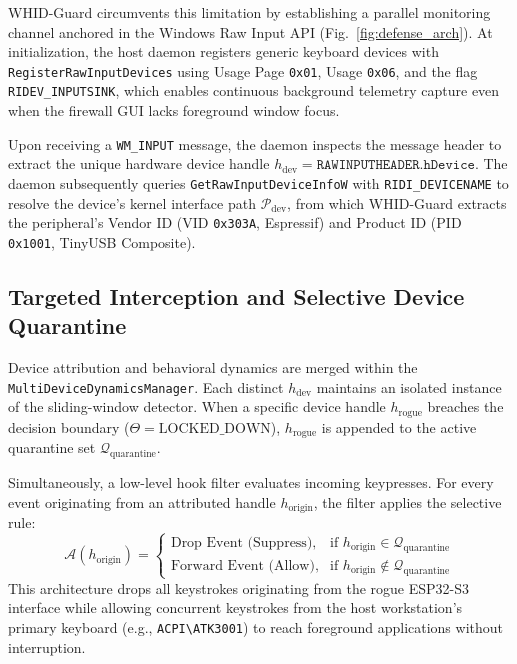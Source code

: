 \documentclass[conference]{IEEEtran}
\begin{document}
WHID-Guard circumvents this limitation by establishing a parallel monitoring channel anchored in the Windows Raw Input API (Fig.~\ref{fig:defense_arch}). At initialization, the host daemon registers generic keyboard devices with \texttt{RegisterRawInputDevices} using Usage Page \texttt{0x01}, Usage \texttt{0x06}, and the flag \texttt{RIDEV\_INPUTSINK}, which enables continuous background telemetry capture even when the firewall GUI lacks foreground window focus.

Upon receiving a \texttt{WM\_INPUT} message, the daemon inspects the message header to extract the unique hardware device handle $h_{\text{dev}} = \texttt{RAWINPUTHEADER.hDevice}$. The daemon subsequently queries \texttt{GetRawInputDeviceInfoW} with \texttt{RIDI\_DEVICENAME} to resolve the device's kernel interface path $\mathcal{P}_{\text{dev}}$, from which WHID-Guard extracts the peripheral's Vendor ID (VID \texttt{0x303A}, Espressif) and Product ID (PID \texttt{0x1001}, TinyUSB Composite).

\subsection{Targeted Interception and Selective Device Quarantine}
Device attribution and behavioral dynamics are merged within the \texttt{MultiDeviceDynamicsManager}. Each distinct $h_{\text{dev}}$ maintains an isolated instance of the sliding-window detector. When a specific device handle $h_{\text{rogue}}$ breaches the decision boundary ($\Theta = \text{LOCKED\_DOWN}$), $h_{\text{rogue}}$ is appended to the active quarantine set $\mathcal{Q}_{\text{quarantine}}$.

Simultaneously, a low-level hook filter evaluates incoming keypresses. For every event originating from an attributed handle $h_{\text{origin}}$, the filter applies the selective rule:
\begin{equation}
\mathcal{A}(h_{\text{origin}}) = 
\begin{cases}
\text{Drop Event (Suppress)}, & \text{if } h_{\text{origin}} \in \mathcal{Q}_{\text{quarantine}} \\
\text{Forward Event (Allow)}, & \text{if } h_{\text{origin}} \notin \mathcal{Q}_{\text{quarantine}}
\end{cases}
\label{eq:selective_action}
\end{equation}
This architecture drops all keystrokes originating from the rogue ESP32-S3 interface while allowing concurrent keystrokes from the host workstation's primary keyboard (e.g., \texttt{ACPI\textbackslash ATK3001}) to reach foreground applications without interruption.
\end{document}
